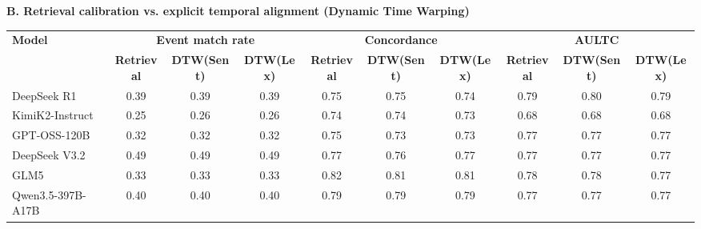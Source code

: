 \begin{table}[htbp]
\begin{ChEightFloatBody}
\begin{minipage}{\textwidth}
\noindent\textbf{B. Retrieval calibration vs. explicit temporal alignment (Dynamic Time Warping)}


\begin{adjustbox}{max width=\textwidth}
\begin{tabular}{@{}l*{9}{c}@{}}
\hline
\multirow{2}{*}{\textbf{Model}}
& \multicolumn{3}{c}{\textbf{Event match rate}}
& \multicolumn{3}{c}{\textbf{Concordance}}
& \multicolumn{3}{c}{\textbf{AULTC}} \\
\cline{2-4}\cline{5-7}\cline{8-10}
& \textbf{Retrieval}
& \textbf{DTW(Sent)}
& \textbf{DTW(Lex)}
& \textbf{Retrieval}
& \textbf{DTW(Sent)}
& \textbf{DTW(Lex)}
& \textbf{Retrieval}
& \textbf{DTW(Sent)}
& \textbf{DTW(Lex)} \\
\hline
DeepSeek R1
& 0.39 & 0.39 & 0.39
& 0.75 & 0.75 & 0.74
& 0.79 & 0.80 & 0.79 \\

KimiK2-Instruct
& 0.25 & 0.26 & 0.26
& 0.74 & 0.74 & 0.73
& 0.68 & 0.68 & 0.68 \\

GPT-OSS-120B
& 0.32 & 0.32 & 0.32
& 0.75 & 0.73 & 0.73
& 0.77 & 0.77 & 0.77 \\

DeepSeek V3.2
& 0.49 & 0.49 & 0.49
& 0.77 & 0.76 & 0.77
& 0.77 & 0.77 & 0.77 \\

GLM5
& 0.33 & 0.33 & 0.33
& 0.82 & 0.81 & 0.81
& 0.78 & 0.78 & 0.77 \\

Qwen3.5-397B-A17B
& 0.40 & 0.40 & 0.40
& 0.79 & 0.79 & 0.79
& 0.77 & 0.77 & 0.77 \\
\hline
\end{tabular}
\end{adjustbox}



\end{minipage}




\end{ChEightFloatBody}
\end{table}